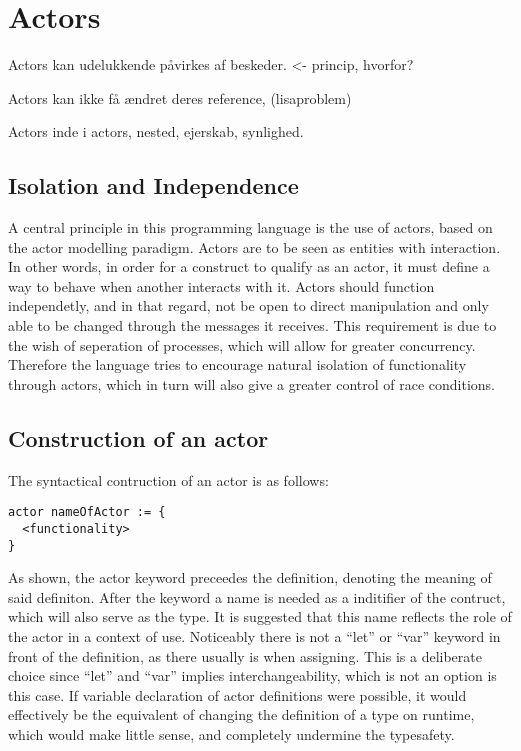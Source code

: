 \section{Actors}

Actors kan udelukkende påvirkes af beskeder. <- princip, hvorfor?

Actors kan ikke få ændret deres reference, (lisaproblem)

Actors inde i actors, nested, ejerskab, synlighed.



\subsection{Isolation and Independence}

A central principle in this programming language is the use of actors, based on the actor modelling paradigm. Actors are to be seen as entities with interaction. In other words, in order for a construct to qualify as an actor, it must define a way to behave when another interacts with it. Actors should function independetly, and in that regard, not be open to direct manipulation and only able to be changed through the messages it receives. This requirement is due to the wish of seperation of processes, which will allow for greater concurrency. Therefore the language tries to encourage natural isolation of functionality through actors, which in turn will also give a greater control of race conditions.

\subsection{Construction of an actor}

The syntactical contruction of an actor is as follows:

\begin{lstlisting}
actor nameOfActor := {
  <functionality>
}
\end{lstlisting}

As shown, the actor keyword preceedes the definition, denoting the meaning of said definiton. After the keyword a name is needed as a inditifier of the contruct, which will also serve as the type. It is suggested that this name reflects the role of the actor in a context of use. Noticeably there is not a \enquote{let} or \enquote{var} keyword in front of the definition, as there usually is when assigning. This is a deliberate choice since \enquote{let} and \enquote{var} implies interchangeability, which is not an option is this case. If variable declaration of actor definitions were possible, it would effectively be the equivalent of changing the definition of a type on runtime, which would make little sense, and completely undermine the typesafety.




